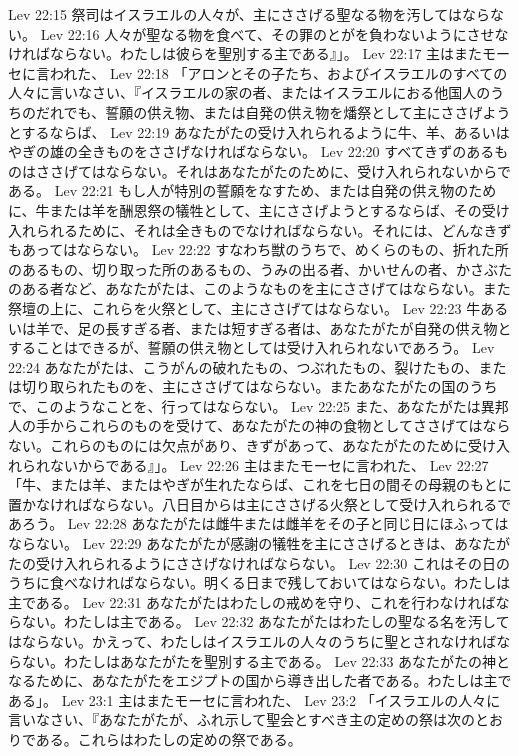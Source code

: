 Lev 22:15  祭司はイスラエルの人々が、主にささげる聖なる物を汚してはならない。
Lev 22:16  人々が聖なる物を食べて、その罪のとがを負わないようにさせなければならない。わたしは彼らを聖別する主である』」。
Lev 22:17  主はまたモーセに言われた、
Lev 22:18  「アロンとその子たち、およびイスラエルのすべての人々に言いなさい、『イスラエルの家の者、またはイスラエルにおる他国人のうちのだれでも、誓願の供え物、または自発の供え物を燔祭として主にささげようとするならば、
Lev 22:19  あなたがたの受け入れられるように牛、羊、あるいはやぎの雄の全きものをささげなければならない。
Lev 22:20  すべてきずのあるものはささげてはならない。それはあなたがたのために、受け入れられないからである。
Lev 22:21  もし人が特別の誓願をなすため、または自発の供え物のために、牛または羊を酬恩祭の犠牲として、主にささげようとするならば、その受け入れられるために、それは全きものでなければならない。それには、どんなきずもあってはならない。
Lev 22:22  すなわち獣のうちで、めくらのもの、折れた所のあるもの、切り取った所のあるもの、うみの出る者、かいせんの者、かさぶたのある者など、あなたがたは、このようなものを主にささげてはならない。また祭壇の上に、これらを火祭として、主にささげてはならない。
Lev 22:23  牛あるいは羊で、足の長すぎる者、または短すぎる者は、あなたがたが自発の供え物とすることはできるが、誓願の供え物としては受け入れられないであろう。
Lev 22:24  あなたがたは、こうがんの破れたもの、つぶれたもの、裂けたもの、または切り取られたものを、主にささげてはならない。またあなたがたの国のうちで、このようなことを、行ってはならない。
Lev 22:25  また、あなたがたは異邦人の手からこれらのものを受けて、あなたがたの神の食物としてささげてはならない。これらのものには欠点があり、きずがあって、あなたがたのために受け入れられないからである』」。
Lev 22:26  主はまたモーセに言われた、
Lev 22:27  「牛、または羊、またはやぎが生れたならば、これを七日の間その母親のもとに置かなければならない。八日目からは主にささげる火祭として受け入れられるであろう。
Lev 22:28  あなたがたは雌牛または雌羊をその子と同じ日にほふってはならない。
Lev 22:29  あなたがたが感謝の犠牲を主にささげるときは、あなたがたの受け入れられるようにささげなければならない。
Lev 22:30  これはその日のうちに食べなければならない。明くる日まで残しておいてはならない。わたしは主である。
Lev 22:31  あなたがたはわたしの戒めを守り、これを行わなければならない。わたしは主である。
Lev 22:32  あなたがたはわたしの聖なる名を汚してはならない。かえって、わたしはイスラエルの人々のうちに聖とされなければならない。わたしはあなたがたを聖別する主である。
Lev 22:33  あなたがたの神となるために、あなたがたをエジプトの国から導き出した者である。わたしは主である」。
Lev 23:1  主はまたモーセに言われた、
Lev 23:2  「イスラエルの人々に言いなさい、『あなたがたが、ふれ示して聖会とすべき主の定めの祭は次のとおりである。これらはわたしの定めの祭である。
